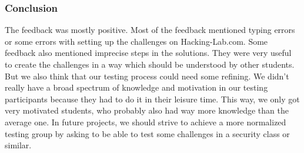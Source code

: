 \subsubsection{Conclusion}
The feedback was mostly positive. Most of the feedback mentioned typing errors or some errors with setting up the challenges on Hacking-Lab.com. Some feedback also mentioned imprecise steps in the solutions. They were very useful to create the challenges in a way which should be understood by other students. \\
But we also think that our testing process could need some refining. We didn't really have a broad spectrum of knowledge and motivation in our testing participants because they had to do it in their leisure time. This way, we only got very motivated students, who probably also had way more knowledge than the average one. In future projects, we should strive to achieve a more normalized testing group by asking to be able to test some challenges in a security class or similar.
